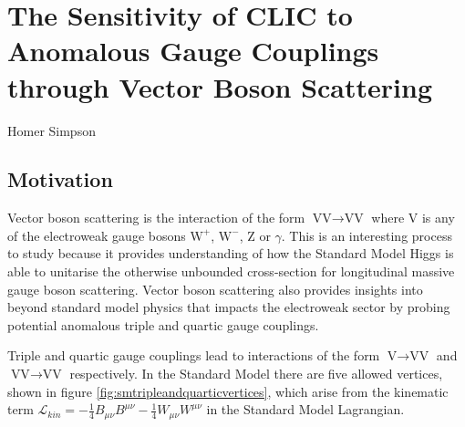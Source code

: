 \chapter{The Sensitivity of CLIC to Anomalous Gauge Couplings through Vector Boson Scattering}
\label{chap:PhysicsAnalysis}

%
{Homer Simpson}


\section{Motivation}
Vector boson scattering is the interaction of the form $\text{VV} \rightarrow \text{VV}$ where V is any of the electroweak gauge bosons $\text{W}^{+}$, $\text{W}^{-}$, Z or $\gamma$.  This is an interesting process to study because it provides understanding of how the Standard Model Higgs is able to unitarise the otherwise unbounded cross-section for longitudinal massive gauge boson scattering.  Vector boson scattering also provides insights into beyond standard model physics that impacts the electroweak sector by probing potential anomalous triple and quartic gauge couplings.  

Triple and quartic gauge couplings lead to interactions of the form $\text{V} \rightarrow \text{VV}$ and $\text{VV} \rightarrow \text{VV}$ respectively.  In the Standard Model there are five allowed vertices, shown in figure \ref{fig:smtripleandquarticvertices}, which arise from the kinematic term $\mathcal{L}_{kin} = -\frac{1}{4}B_{\mu\nu}B^{\mu\nu} - \frac{1}{4}W_{\mu\nu}W^{\mu\nu}$ in the Standard Model Lagrangian.

